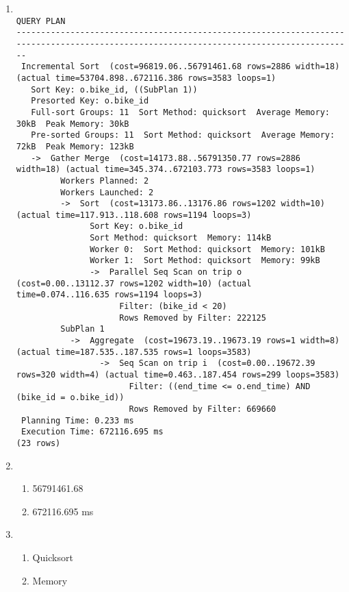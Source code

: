 \documentclass{homework}
\begin{document}
\begin{enumerate}[start=2]
    \item \begin{verbatim}
                                                               QUERY PLAN
----------------------------------------------------------------------------------------------------------------------------------------
 Incremental Sort  (cost=96819.06..56791461.68 rows=2886 width=18) (actual time=53704.898..672116.386 rows=3583 loops=1)
   Sort Key: o.bike_id, ((SubPlan 1))
   Presorted Key: o.bike_id
   Full-sort Groups: 11  Sort Method: quicksort  Average Memory: 30kB  Peak Memory: 30kB
   Pre-sorted Groups: 11  Sort Method: quicksort  Average Memory: 72kB  Peak Memory: 123kB
   ->  Gather Merge  (cost=14173.88..56791350.77 rows=2886 width=18) (actual time=345.374..672103.773 rows=3583 loops=1)
         Workers Planned: 2
         Workers Launched: 2
         ->  Sort  (cost=13173.86..13176.86 rows=1202 width=10) (actual time=117.913..118.608 rows=1194 loops=3)
               Sort Key: o.bike_id
               Sort Method: quicksort  Memory: 114kB
               Worker 0:  Sort Method: quicksort  Memory: 101kB
               Worker 1:  Sort Method: quicksort  Memory: 99kB
               ->  Parallel Seq Scan on trip o  (cost=0.00..13112.37 rows=1202 width=10) (actual time=0.074..116.635 rows=1194 loops=3)
                     Filter: (bike_id < 20)
                     Rows Removed by Filter: 222125
         SubPlan 1
           ->  Aggregate  (cost=19673.19..19673.19 rows=1 width=8) (actual time=187.535..187.535 rows=1 loops=3583)
                 ->  Seq Scan on trip i  (cost=0.00..19672.39 rows=320 width=4) (actual time=0.463..187.454 rows=299 loops=3583)
                       Filter: ((end_time <= o.end_time) AND (bike_id = o.bike_id))
                       Rows Removed by Filter: 669660
 Planning Time: 0.233 ms
 Execution Time: 672116.695 ms
(23 rows)
\end{verbatim}

    \item \begin{enumerate}
        \item 56791461.68
        \item 672116.695 ms
    \end{enumerate}

    \item \begin{enumerate}
        \item Quicksort
        \item Memory
    \end{enumerate}


\end{enumerate}
\end{document}
